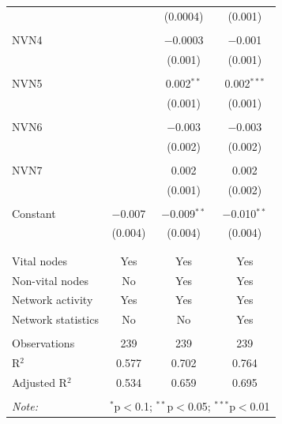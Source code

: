 \begin{table}[!htbp]
\begin{tabular}{@{\extracolsep{5pt}}lccc}
  &  & (0.0004) & (0.001) \\ 
  & & & \\ 
 NVN4 &  & $-$0.0003 & $-$0.001 \\ 
  &  & (0.001) & (0.001) \\ 
  & & & \\ 
 NVN5 &  & 0.002$^{**}$ & 0.002$^{***}$ \\ 
  &  & (0.001) & (0.001) \\ 
  & & & \\ 
 NVN6 &  & $-$0.003 & $-$0.003 \\ 
  &  & (0.002) & (0.002) \\ 
  & & & \\ 
 NVN7 &  & 0.002 & 0.002 \\ 
  &  & (0.001) & (0.002) \\ 
  & & & \\ 
 Constant & $-$0.007 & $-$0.009$^{**}$ & $-$0.010$^{**}$ \\ 
  & (0.004) & (0.004) & (0.004) \\ 
  & & & \\ 
\hline \\[-1.8ex] 
Vital nodes & Yes & Yes & Yes \\ 
Non-vital nodes & No & Yes & Yes \\ 
Network activity & Yes & Yes & Yes \\ 
Network statistics & No & No & Yes \\ 
\hline &  &  &  \\ 
Observations & 239 & 239 & 239 \\ 
R$^{2}$ & 0.577 & 0.702 & 0.764 \\ 
Adjusted R$^{2}$ & 0.534 & 0.659 & 0.695 \\ 
\hline 
\hline \\[-1.8ex] 
\textit{Note:}  & \multicolumn{3}{r}{$^{*}$p$<$0.1; $^{**}$p$<$0.05; $^{***}$p$<$0.01} \\ 
\end{tabular} 
\end{table} 
